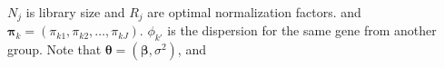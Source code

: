 \documentclass[paper=a4, fontsize=12.5pt]{scrartcl} %
\numberwithin{equation}{section} %
\numberwithin{figure}{section} %
\numberwithin{table}{section} %
\begin{document}
	 $N_j$ is library size and $R_j$ are optimal normalization factors.
  and $
  \bm\pi_k=(\pi_{k1}, \pi_{k2}, \ldots, \pi_{kJ})$. $\phi_{k'}$ is the dispersion for the same gene from another group. %
  Note that $\bm \theta= (\bm \beta, \sigma^2)$, and
  
\end{document}
